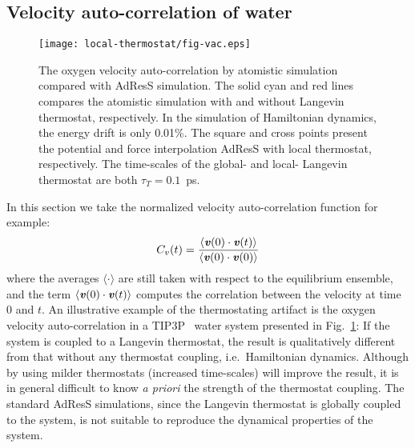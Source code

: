 \documentclass[epjST]{svjour}
\newcommand{\vect}[1]{\textbf{\textit{#1}}}
\begin{document}


\subsection{Velocity auto-correlation of water}

\begin{figure}
  \centering
  \texttt{[image: local-thermostat/fig-vac.eps]}
  \caption{The oxygen velocity auto-correlation by atomistic
    simulation compared with AdResS simulation.  The solid cyan and
    red lines compares the atomistic simulation with and without
    Langevin thermostat, respectively.
    In the simulation of Hamiltonian dynamics, the energy drift is only 0.01\%.
    The square and cross points
    present the potential and force interpolation AdResS with local
    thermostat, respectively.  The time-scales of the global- and local- Langevin
  thermostat are both $\tau_T = 0.1$~ps.}
  \label{fig:vac}
\end{figure}

In this section we take the normalized velocity auto-correlation function
for example:
\begin{align}
  C_v(t) = \frac{\langle \vect v(0)\cdot \vect v(t) \rangle}{\langle \vect v(0)\cdot \vect v(0) \rangle}
\end{align}
where the averages $\langle\cdot\rangle$ are still taken with respect
to the equilibrium ensemble, and the term
$\langle \vect v(0)\cdot \vect v(t)\rangle$ computes the correlation
between the velocity at time $0$ and $t$. 
An illustrative example of the thermostating artifact is 
the oxygen velocity auto-correlation
in a TIP3P~\cite{jorgensen1983comparison} water system presented in Fig.~\ref{fig:vac}: If the system
is coupled to a Langevin thermostat, the result is qualitatively
different from that without any thermostat coupling, i.e.~Hamiltonian
dynamics. Although by using milder thermostats (increased time-scales)
will improve the result, it is in general difficult to know \emph{a priori}
the strength of the thermostat coupling.
The standard AdResS simulations, since the Langevin thermostat
is globally coupled to the system,  is not suitable to reproduce the dynamical
properties of the system.
\end{document}

